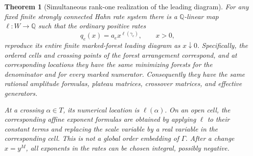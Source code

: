 \documentclass[11pt]{article}
\numberwithin{equation}{section}
\newtheorem{theorem}{Theorem}[section]
\theoremstyle{definition}
\theoremstyle{remark}
\newcommand{\Q}{\mathbb Q}
\begin{document}
\begin{theorem}[Simultaneous rank-one realization of the leading diagram]
\label{markov:thm:rank-one}
For any fixed finite strongly connected Hahn rate system there is a
$\Q$-linear map $\ell:W\to\Q$ such that the ordinary positive rates
\begin{equation}\label{markov:eq:real-specialization}
 q_e(x)=a_e x^{\ell(\gamma_e)},\qquad x>0,
\end{equation}
reproduce its entire finite marked-forest leading diagram as $x\downarrow0$.
Specifically, the ordered cells and crossing points of the forest arrangement
correspond, and at corresponding locations they have the same minimizing forests
for the denominator and for every marked numerator. Consequently they have the
same rational amplitude formulas, plateau matrices, crossover matrices, and
effective generators.

At a crossing $\alpha\in T$, its numerical location is $\ell(\alpha)$.
On an open cell, the corresponding affine exponent formulas are obtained by
applying $\ell$ to their constant terms and replacing the scale variable by a
real variable in the corresponding cell. This is not a global order embedding
of $\Gamma$. After a change $x=y^M$, all exponents in the rates can be chosen
integral, possibly negative.
\end{theorem}
\end{document}

